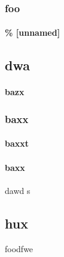 \documentclass[]{article}
\begin{document}
\section{foo}


\subsection*{\% [unnamed]}

\begin{center}
\part*{dwa}





\subsection{bazx}


\section{baxx}



\subsection{baxxt}




\end{center}




\subsection{baxx}



dawd
s


\chapter{hux}




foodfwe
\end{document}

